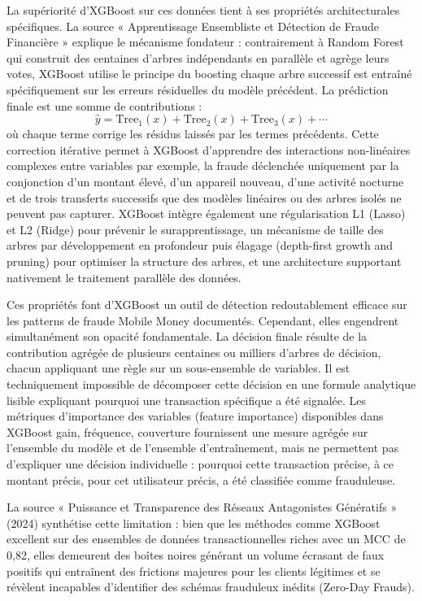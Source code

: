 \documentclass[11pt,a4paper,oneside]{report}
\theoremstyle{definition}
\theoremstyle{remark}
\begin{document}
La supériorité d'XGBoost sur ces données tient à ses propriétés architecturales spécifiques. La source « Apprentissage Ensembliste et Détection de Fraude Financière » explique le mécanisme fondateur : contrairement à Random Forest qui construit des centaines d'arbres indépendants en parallèle et agrège leurs votes, XGBoost utilise le principe du boosting  chaque arbre successif est entraîné spécifiquement sur les erreurs résiduelles du modèle précédent. La prédiction finale est une somme de contributions :
\begin{equation}
\hat{y} = \text{Tree}_1(x) + \text{Tree}_2(x) + \text{Tree}_3(x) + \cdots
\end{equation}
où chaque terme corrige les résidus laissés par les termes précédents. Cette correction itérative permet à XGBoost d'apprendre des interactions non-linéaires complexes entre variables  par exemple, la fraude déclenchée uniquement par la conjonction d'un montant élevé, d'un appareil nouveau, d'une activité nocturne et de trois transferts successifs  que des modèles linéaires ou des arbres isolés ne peuvent pas capturer. XGBoost intègre également une régularisation L1 (Lasso) et L2 (Ridge) pour prévenir le surapprentissage, un mécanisme de taille des arbres par développement en profondeur puis élagage (depth-first growth and pruning) pour optimiser la structure des arbres, et une architecture supportant nativement le traitement parallèle des données.

Ces propriétés font d'XGBoost un outil de détection redoutablement efficace sur les patterns de fraude Mobile Money documentés. Cependant, elles engendrent simultanément son opacité fondamentale. La décision finale résulte de la contribution agrégée de plusieurs centaines ou milliers d'arbres de décision, chacun appliquant une règle sur un sous-ensemble de variables. Il est techniquement impossible de décomposer cette décision en une formule analytique lisible expliquant pourquoi une transaction spécifique a été signalée. Les métriques d'importance des variables (feature importance) disponibles dans XGBoost  gain, fréquence, couverture  fournissent une mesure agrégée sur l'ensemble du modèle et de l'ensemble d'entraînement, mais ne permettent pas d'expliquer une décision individuelle : pourquoi cette transaction précise, à ce montant précis, pour cet utilisateur précis, a été classifiée comme frauduleuse.

La source « Puissance et Transparence des Réseaux Antagonistes Génératifs » (2024) synthétise cette limitation : bien que les méthodes comme XGBoost excellent sur des ensembles de données transactionnelles riches avec un MCC de 0,82, elles demeurent des boîtes noires générant un volume écrasant de faux positifs qui entraînent des frictions majeures pour les clients légitimes et se révèlent incapables d'identifier des schémas frauduleux inédits (Zero-Day Frauds).
\end{document}
